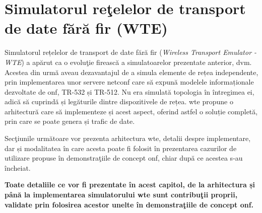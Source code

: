 \chapter{Simulatorul reţelelor de transport de date fără fir (WTE)\label{ch:wte}}

\graphicspath{ {cap-wte/figures/} }

Simulatorul rețelelor de transport de date fără fir (\textit{Wireless Transport Emulator - WTE}) a apărut ca o evoluţie firească a simulatoarelor prezentate anterior, \gls{dvm}. Acestea din urmă aveau dezavantajul de a simula elemente de rețea independente, prin implementarea unor servere \gls{netconf} care să expună modelele informaționale dezvoltate de \gls{onf}, TR-532 și TR-512. Nu era simulată topologia în întregimea ei, adică să cuprindă și legăturile dintre dispozitivele de rețea. \gls{wte} propune o arhitectură care să implementeze și acest aspect, oferind astfel o soluție completă, prin care se poate genera și trafic de date.

Secţiunile următoare vor prezenta arhitectura \gls{wte}, detalii despre implementare, dar și modalitatea în care acesta poate fi folosit în prezentarea cazurilor de utilizare propuse în demonstraţiile de concept \gls{onf}, chiar după ce acestea s-au încheiat.

\textbf{Toate detaliile ce vor fi prezentate în acest capitol, de la arhitectura și până la implementarea simulatorului \gls{wte} sunt contribuţii proprii, validate prin folosirea acestor unelte în demonstraţiile de concept \gls{onf}.}




